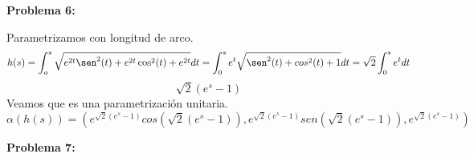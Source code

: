 \documentclass{article}
\begin{document}
\textbf{Problema 6:}

Parametrizamos con longitud de arco.
$$
h(s)=\int_o^s \sqrt{e^{2t} \sen^2(t) + e^{2t} \cos^2(t) + e^{2t}} dt = \int_0^s e^t \sqrt{\sen^2(t) + cos^2(t) + 1} dt = \sqrt{2}\int_0^se^t dt
$$
$$
\sqrt{2}(e^s-1)
$$
Veamos que es una parametrización unitaria.
$$
\alpha(h(s))=(e^{\sqrt{2}(e^s-1)}cos(\sqrt{2}(e^s-1)),e^{\sqrt{2}(e^s-1)}sen(\sqrt{2}(e^s-1)), e^{\sqrt{2}(e^s-1)})
$$

\textbf{Problema 7:}
\end{document}
